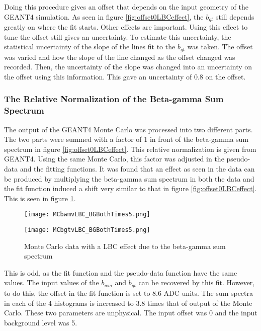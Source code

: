 \documentclass[../MaxHughesThesis.tex]{subfiles}
\begin{document}
Doing this procedure gives an offset that depends on the input geometry of the GEANT4 simulation.
As seen in figure \ref{fig:offset0LBCeffect}, the $b_{gt}$ still depends greatly on where the fit starts.
Other effects are important. 
Using this effect to tune the offset still gives an uncertainty. 
To estimate this uncertainty, the statistical uncertainty of the slope of the lines fit to the $b_{gt}$  was taken.
The offset was varied and how the slope of the line changed as the offset changed was recorded.
Then, the uncertainty of the slope was changed into an uncertainty on the offset using this information.
This gave an uncertainty of 0.8 on the offset.

\subsubsection{The Relative Normalization of the Beta-gamma Sum Spectrum}

The output of the GEANT4 Monte Carlo was processed into two different parts.
The two parts were summed with a factor of 1 in front of the beta-gamma sum spectrum in figure \ref{fig:offset0LBCeffect}.
This relative normalization is given from GEANT4.
Using the same Monte Carlo, this factor was adjusted in the pseudo-data and the fitting functions.
It was found that an effect as seen in the data can be produced by multiplying the beta-gamma sum spectrum in both the data and the fit function induced a shift very similar to that in figure \ref{fig:offset0LBCeffect}.
This is seen in figure \ref{fig:MCTimes5}.    

\begin{figure}
    \centering
    \begin{minipage}{0.50\textwidth}
        \centerline{\texttt{[image: MCbwmvLBC\_BGBothTimes5.png]}}
    \end{minipage}\hfill
    \begin{minipage}{0.50\textwidth}
        \centerline{\texttt{[image: MCbgtvLBC\_BGBothTimes5.png]}}
    \end{minipage}
    \caption{Monte Carlo data with a LBC effect due to the beta-gamma sum spectrum}
    \label{fig:MCTimes5}
\end{figure}

This is odd, as the fit function and the pseudo-data function have the same values.
The input values of the $b_{wm}$ and $b_{gt}$ can be recovered by this fit.
However, to do this, the offset in the fit function is set to 8.6 ADC units.
The sum spectra in each of the 4 histograms is increased to 3.8 times that of output of the Monte Carlo.
These two parameters are unphysical.
The input offset was 0 and the input background level was 5.
\end{document}
